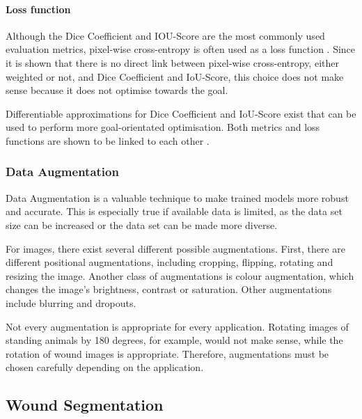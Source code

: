 
\paragraph{Loss function}

Although the Dice Coefficient and IOU-Score are the most commonly used evaluation metrics, pixel-wise cross-entropy is often used as a loss function \cite{Eelbode}. Since it is shown that there is no direct link between pixel-wise cross-entropy, either weighted or not, and Dice Coefficient and IoU-Score, this choice does not make sense because it does not optimise towards the goal.

Differentiable approximations for Dice Coefficient and IoU-Score exist that can be used to perform more goal-orientated optimisation. Both metrics and loss functions are shown to be linked to each other \cite{Eelbode}.


\subsubsection{Data Augmentation}

Data Augmentation is a valuable technique to make trained models more robust and accurate. This is especially true if available data is limited, as the data set size can be increased or the data set can be made more diverse.

For images, there exist several different possible augmentations. First, there are different positional augmentations, including cropping, flipping, rotating and resizing the image. Another class of augmentations is colour augmentation, which changes the image's brightness, contrast or saturation. Other augmentations include blurring and dropouts.

Not every augmentation is appropriate for every application. Rotating images of standing animals by 180 degrees, for example, would not make sense, while the rotation of wound images is appropriate. Therefore, augmentations must be chosen carefully depending on the application.




\subsection{Wound Segmentation}



